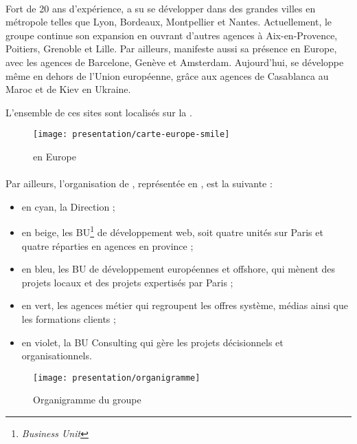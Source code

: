 \paragraph{}
Fort de 20 ans d'expérience, \asmile{} a su se développer dans des grandes villes en métropole telles que Lyon, Bordeaux, Montpellier et Nantes.
Actuellement, le groupe continue son expansion en ouvrant d'autres agences à Aix-en-Provence, Poitiers, Grenoble et Lille.
Par ailleurs, \asmile{} manifeste aussi sa présence en Europe, avec les agences de Barcelone, Genève et Amsterdam.
Aujourd'hui, \asmile{} se développe même en dehors de l'Union européenne, grâce aux agences de Casablanca au Maroc et de Kiev en Ukraine.

L'ensemble de ces sites sont localisés sur la .

\begin{figure}
	\centering
	\texttt{[image: presentation/carte-europe-smile]}
	\caption{\asmile{} en Europe}
	\label{figure:presentation:carte}
\end{figure}


\paragraph{}
Par ailleurs, l'organisation de \asmile{}, représentée en , est la suivante :

\begin{itemize}
	\item en cyan, la Direction ;
	\item en beige, les BU\footnote{\textit{Business Unit}} de développement web, soit quatre unités sur Paris et quatre réparties en agences en province ;
	\item en bleu, les BU de développement européennes et offshore, qui mènent des projets locaux et des projets expertisés par Paris ;
	\item en vert, les agences métier qui regroupent les offres système, médias ainsi que les formations clients ;
	\item en violet, la BU Consulting qui gère les projets décisionnels et organisationnels.
\end{itemize}

\begin{figure}
	\centering
	\texttt{[image: presentation/organigramme]}
	\caption{Organigramme du groupe \asmile}
	\label{figure:presentation:organigramme}
\end{figure}


